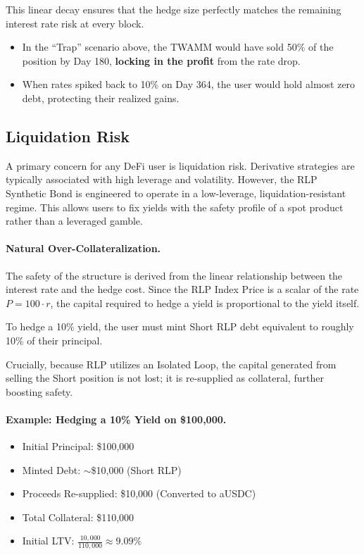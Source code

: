 \documentclass[12pt]{article}
\begin{document}
This linear decay ensures that the hedge size perfectly matches the remaining interest rate risk at every block.

\begin{itemize}
    \item In the ``Trap'' scenario above, the TWAMM would have sold 50\% of the position by Day 180, \textbf{locking in the profit} from the rate drop.
    \item When rates spiked back to 10\% on Day 364, the user would hold almost zero debt, protecting their realized gains.
\end{itemize}

\subsection{Liquidation Risk}

A primary concern for any DeFi user is liquidation risk. Derivative strategies are typically associated with high leverage and volatility. However, the RLP Synthetic Bond is engineered to operate in a low-leverage, liquidation-resistant regime. This allows users to fix yields with the safety profile of a spot product rather than a leveraged gamble.

\paragraph{Natural Over-Collateralization.}
The safety of the structure is derived from the linear relationship between the interest rate and the hedge cost. Since the RLP Index Price is a scalar of the rate $P = 100 \cdot r$, the capital required to hedge a yield is proportional to the yield itself.

To hedge a 10\% yield, the user must mint Short RLP debt equivalent to roughly 10\% of their principal.

Crucially, because RLP utilizes an Isolated Loop, the capital generated from selling the Short position is not lost; it is re-supplied as collateral, further boosting safety.

\paragraph{Example: Hedging a 10\% Yield on \$100,000.}

\begin{itemize}
    \item Initial Principal: \$100,000
    \item Minted Debt: $\sim$\$10,000 (Short RLP)
    \item Proceeds Re-supplied: \$10,000 (Converted to aUSDC)
    \item Total Collateral: \$110,000
    \item Initial LTV: $\frac{10{,}000}{110{,}000} \approx 9.09\%$
\end{itemize}
\end{document}
